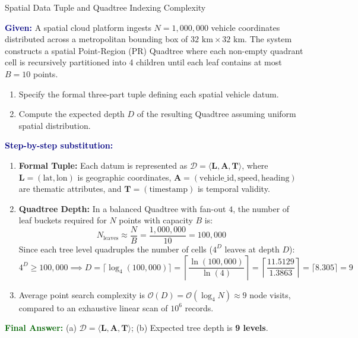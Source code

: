 \documentclass[11pt,a4paper,openany]{report}
\newcommand{\Given}{\par\textbf{\textcolor{navy}{Given:}} }
\newcommand{\Steps}{\par\textbf{\textcolor{navy}{Step-by-step substitution:}}\par}
\newcommand{\Answer}{\par\textbf{\textcolor{darkgreen}{Final Answer:}} }
\begin{document}
\begin{solved}{Spatial Data Tuple and Quadtree Indexing Complexity}
\Given A spatial cloud platform ingests $N = 1,000,000$ vehicle coordinates distributed across a metropolitan bounding box of $32\text{ km} \times 32\text{ km}$. The system constructs a spatial Point-Region (PR) Quadtree where each non-empty quadrant cell is recursively partitioned into 4 children until each leaf contains at most $B = 10$ points.
\begin{enumerate}[label=(\alph*),leftmargin=*]
  \item Specify the formal three-part tuple defining each spatial vehicle datum.
  \item Compute the expected depth $D$ of the resulting Quadtree assuming uniform spatial distribution.
\end{enumerate}
\Steps
\begin{enumerate}[leftmargin=*]
  \item \textbf{Formal Tuple:} Each datum is represented as $\mathcal{D} = \langle \mathbf{L}, \mathbf{A}, \mathbf{T} \rangle$, where $\mathbf{L} = (\text{lat}, \text{lon})$ is geographic coordinates, $\mathbf{A} = (\text{vehicle\_id}, \text{speed}, \text{heading})$ are thematic attributes, and $\mathbf{T} = (\text{timestamp})$ is temporal validity.
  \item \textbf{Quadtree Depth:}
  In a balanced Quadtree with fan-out $4$, the number of leaf buckets required for $N$ points with capacity $B$ is:
  \begin{equation}
  N_{\text{leaves}} \approx \frac{N}{B} = \frac{1,000,000}{10} = 100,000
  \end{equation}
  Since each tree level quadruples the number of cells ($4^D$ leaves at depth $D$):
  \begin{equation}
  4^D \ge 100,000 \implies D = \lceil \log_4(100,000) \rceil = \left\lceil \frac{\ln(100,000)}{\ln(4)} \right\rceil = \left\lceil \frac{11.5129}{1.3863} \right\rceil = \lceil 8.305 \rceil = 9
  \end{equation}
  \item Average point search complexity is $\mathcal{O}(D) = \mathcal{O}(\log_4 N) \approx 9$ node visits, compared to an exhaustive linear scan of $10^6$ records.
\end{enumerate}
\Answer (a) $\mathbf{\mathcal{D} = \langle L, A, T \rangle}$; (b) Expected tree depth is \textbf{9 levels}.
\end{solved}
\end{document}

